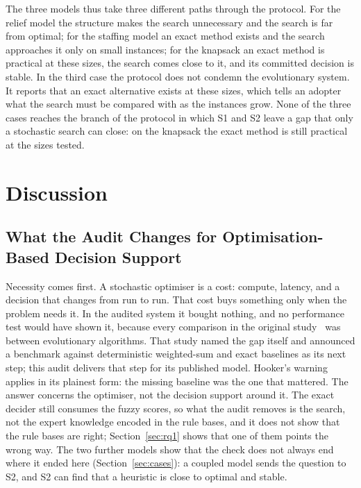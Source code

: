 \documentclass[systems,article,accept,moreauthors,pdftex]{Definitions/mdpi}
\begin{document}
The three models thus take three different paths through the protocol. For the relief model the
structure makes the search unnecessary and the search is far from optimal; for the staffing model
an exact method exists and the search approaches it only on small instances; for the knapsack an
exact method is practical at these sizes, the search comes close to it, and its committed
decision is stable. In the third case the protocol does not condemn the evolutionary system. It
reports that an exact alternative exists at these sizes, which tells an adopter what the search
must be compared with as the instances grow. None of the three cases reaches the branch of the
protocol in which S1 and S2 leave a gap that only a stochastic search can close: on the knapsack
the exact method is still practical at the \linebreak  sizes tested.

\section{Discussion}\label{sec:discussion}

\subsection{What the Audit Changes for Optimisation-Based Decision Support}
Necessity comes first. A stochastic optimiser is a cost: compute, latency, and a decision
that changes from run to run. That cost buys something only when the problem needs it. In the
audited system it bought nothing, and no performance test would have shown it, because every
comparison in the original study~\cite{rabiei2026resilient} was between evolutionary algorithms.
That study named the gap itself and announced a benchmark against deterministic weighted-sum and
exact baselines as its next step; this audit delivers that step for its published model.
Hooker's warning~\cite{hooker1995testing} applies in its plainest form: the missing baseline was
the one that mattered. The answer concerns the optimiser, not the decision support around it.
The exact decider still consumes the fuzzy scores, so what the audit removes is the search, not
the expert knowledge encoded in the rule bases, and it does not show that the rule bases are
right; Section~\ref{sec:rq1} shows that one of them points the wrong way. The two further models
show that the check does not always end where it ended here (Section~\ref{sec:cases}): a coupled
model sends the question to S2, and S2 can find that a heuristic is close to optimal and stable.
\end{document}
